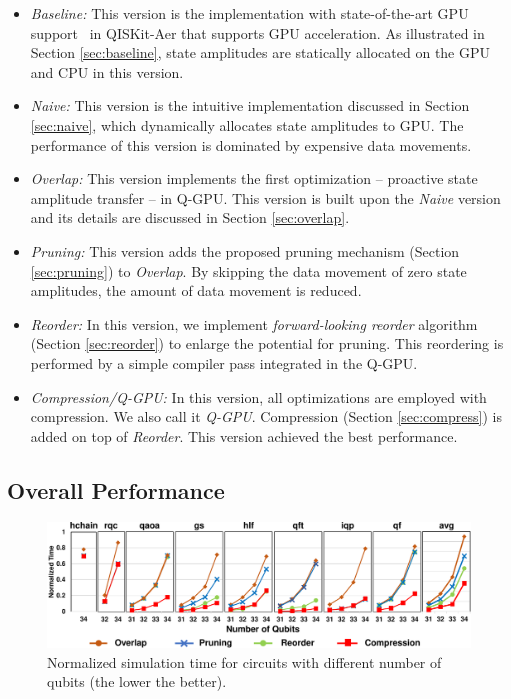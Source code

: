 \begin{itemize}

\item \emph{Baseline:}
This version is the implementation with state-of-the-art GPU support~\cite{10.5281/zenodo.2562111} in QISKit-Aer that supports GPU acceleration. As illustrated in Section \ref{sec:baseline}, state amplitudes are statically allocated on the GPU and CPU in this version. 

\item \emph{Naive:}
This version is the intuitive implementation discussed in Section  \ref{sec:naive}, which dynamically allocates state amplitudes to GPU. The performance of this version is dominated by expensive data movements.

\item \emph{Overlap:}
This version implements the first optimization -- proactive state amplitude transfer -- in Q-GPU. This version is built upon the {\it Naive} version and its details are discussed in Section \ref{sec:overlap}.

\item \emph{Pruning:}
This version adds the proposed pruning mechanism (Section \ref{sec:pruning}) to {\it Overlap}. By skipping the data movement of zero state amplitudes, the amount of data movement is reduced.

\item \emph{Reorder:}
In this version, we implement \emph{forward-looking reorder} algorithm (Section \ref{sec:reorder}) to enlarge the potential for pruning. This reordering is performed by a simple compiler pass integrated in the Q-GPU. 

\item \emph{Compression/Q-GPU:}
In this version, all optimizations are employed with compression. We also call it \emph{Q-GPU}. Compression (Section \ref{sec:compress}) is added on top of {\it Reorder}. This version achieved the best performance.


\end{itemize}

\subsection{Overall Performance}
\label{perfvali}


\begin{figure}[t!]
	\includegraphics[width=\textwidth]{Images/appendix2/section-5/mainres.pdf}
	\centering
	\caption{Normalized simulation time for circuits with different number of qubits (the lower the better).} \label{fig:mainres}
\end{figure} 

